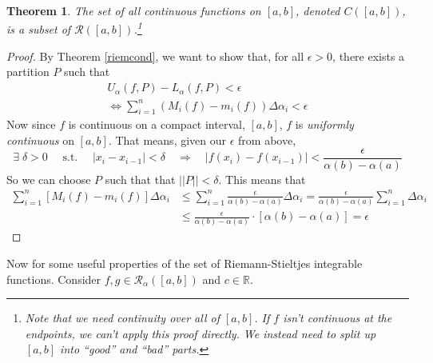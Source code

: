 \documentclass[12pt]{article}
\theoremstyle{plain}
\newtheorem{thm}{Theorem}[subsection]
\theoremstyle{definition}
\theoremstyle{remark}
\begin{document}
\begin{thm} 
    \label{contthm}    
The set of all continuous functions on $[a,b]$, denoted ${C}([a,b])$, is a subset of $\mathscr{R}([a,b])$.\footnote{Note that we need continuity over \emph{all} of $[a,b]$. If $f$ isn't continuous at the endpoints, we can't apply this proof directly. We instead need to split up $[a,b]$ into ``good'' and ``bad'' parts.}
\end{thm}
\begin{proof} 
By Theorem \ref{riemcond}, we want to show that, for all $\epsilon>0$, there exists a partition $P$ such that 
\begin{align*}
    U_\alpha(f,P) - L_\alpha(f,P) < \epsilon  \\
    \Leftrightarrow
    \sum^n_{i=1} (M_i(f) - m_i(f)) \Delta\alpha_i < \epsilon 
\end{align*}
Now since $f$ is continuous on a compact interval, $[a,b]$, $f$ is \emph{uniformly continuous} on $[a,b]$. That means, given our $\epsilon$ from above, 
    \[ \exists \; \delta >0 \quad \text{ s.t. } \quad
        |x_{i} - x_{i-1}| < \delta \quad \Rightarrow \quad
        |f(x_{i}) - f(x_{i-1})| < \frac{\epsilon}{\alpha(b)-\alpha(a)} \]
So we can choose $P$ such that that $||P|| < \delta$.  This means that 
\begin{align*}
    \sum^n_{i=1} [M_i(f) - m_i(f)] \Delta\alpha_i &\leq
    \sum^n_{i=1} \frac{\epsilon}{\alpha(b)-\alpha(a)} 
        \Delta\alpha_i  
    =\frac{\epsilon}{\alpha(b)-\alpha(a)}\sum^n_{i=1}  
        \Delta\alpha_i \\
    &\leq\frac{\epsilon}{\alpha(b)-\alpha(a)} \cdot [\alpha(b)-\alpha(a)] = \epsilon
\end{align*}
\end{proof}
Now for some useful properties of the set of Riemann-Stieltjes integrable functions. Consider $f,g \in \mathscr{R}_\alpha([a,b])$
and $c \in \mathbb{R}$.
\end{document}
